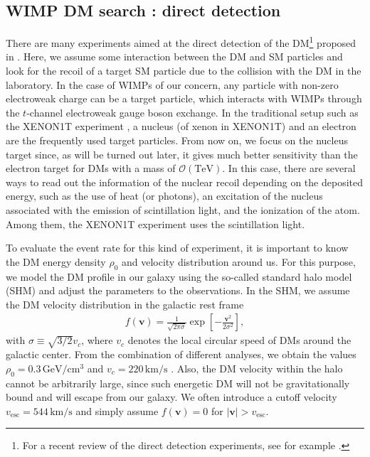 \documentclass[12pt,twoside,book]{article}
\begin{document}
\subsection{WIMP DM search : direct detection}
\label{sec:direct_detection}

There are many experiments aimed at the direct detection of the DM\footnote
{
  For a recent review of the direct detection experiments, see for example \cite{Undagoitia:2015gya}.
}
proposed in \cite{Goodman:1984dc}.
Here, we assume some interaction between the DM and SM particles and look for the recoil of a target SM particle due to the collision with the DM in the laboratory.
In the case of WIMPs of our concern, any particle with non-zero electroweak charge can be a target particle, which interacts with WIMPs through the $t$-channel electroweak gauge boson exchange.
In the traditional setup such as the XENON1T experiment \cite{Aprile:2012zx}, a nucleus (of xenon in XENON1T) and an electron are the frequently used target particles.
From now on, we focus on the nucleus target since, as will be turned out later, it gives much better sensitivity than the electron target for DMs with a mass of $\mathcal{O} (\mathrm{TeV})$.
In this case, there are several ways to read out the information of the nuclear recoil depending on the deposited energy, such as the use of heat (or photons), an excitation of the nucleus associated with the emission of scintillation light, and the ionization of the atom.
Among them, the XENON1T experiment uses the scintillation light.

To evaluate the event rate for this kind of experiment, it is important to know the DM energy density $\rho_0$ and velocity distribution around us.
For this purpose, we model the DM profile in our galaxy using the so-called standard halo model (SHM) and adjust the parameters to the observations.
In the SHM, we assume the DM velocity distribution in the galactic rest frame
\begin{align}
  f(\bm{v}) = \frac{1}{\sqrt{2\pi \sigma}} \exp \left[ -\frac{\bm{v}^2}{2 \sigma^2} \right],
\end{align}
with $\sigma \equiv \sqrt{3/2} v_c$, where $v_c$ denotes the local circular speed of DMs around the galactic center.
From the combination of different analyses, we obtain the values $\rho_0 = 0.3\,\mathrm{GeV / cm^3}$ and $v_c = 220\,\mathrm{km/s}$ \cite{Kerr:1986hz,Green:2011bv}.
Also, the DM velocity within the halo cannot be arbitrarily large, since such energetic DM will not be gravitationally bound and will escape from our galaxy.
We often introduce a cutoff velocity $v_{\mathrm{esc}} = 544\,\mathrm{km / s}$ \cite{Smith:2006ym} and simply assume $f(\bm{v}) = 0$ for $|\bm{v}| > v_{\mathrm{esc}}$.
\end{document}
